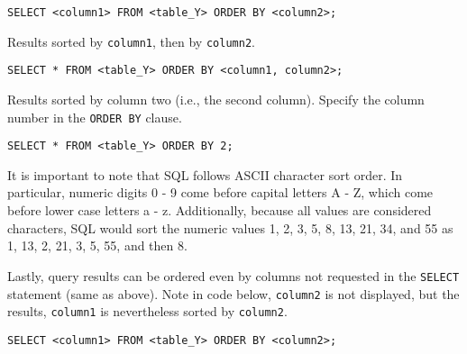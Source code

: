 \documentclass{article}
\begin{document}
\begin{outline}
        
\begin{lstlisting}[belowskip=-1.5 \baselineskip]  
SELECT <column1> FROM <table_Y> ORDER BY <column2>;
\end{lstlisting} 
% 
% 
% 




 
        
         
       \1 Results sorted by \texttt{column1}, then by \texttt{column2}. \\
              
        
\begin{lstlisting}[belowskip=-1.5 \baselineskip]  
SELECT * FROM <table_Y> ORDER BY <column1, column2>;
\end{lstlisting} 
% 
% 
% 
% 
% 
 
        
        
        
        \1 Results sorted by column two (i.e., the second column).  Specify the column number in the \texttt{ORDER BY} clause. \\
        
               
\begin{lstlisting}[belowskip=-1.5 \baselineskip]  
SELECT * FROM <table_Y> ORDER BY 2;
\end{lstlisting} 
% 
% 
%         
                
It is important to note that SQL follows ASCII character sort order.  In particular, numeric digits 0 - 9 come before capital letters A - Z, which come before lower case letters a - z.  Additionally, because all values are considered characters, SQL would sort the numeric values 1, 2, 3, 5, 8, 13, 21, 34, and 55 as 1, 13, 2, 21, 3, 5, 55, and then 8.   







\1 Lastly, query results can be ordered even by columns not requested in the \texttt{SELECT} statement (same as above).  Note in code below, \texttt{column2} is not displayed, but the results, \texttt{column1} is nevertheless sorted by \texttt{column2}.
 
\begin{lstlisting}[belowskip=-1.5 \baselineskip]  
SELECT <column1> FROM <table_Y> ORDER BY <column2>;
\end{lstlisting} 
% 
% 
%         
\end{outline} 
\end{document}
